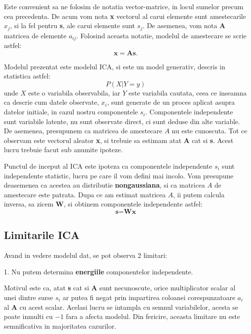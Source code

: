 \documentclass[12pt,oneside]{article}
\begin{document}
Este convenient sa ne folosim de notatia vector-matrice, in locul sumelor precum cea precedenta. De acum vom nota \textbf{x} vectorul al carui elemente sunt amestecarile $x_j$, si la fel pentru \textbf{s}, ale carui elemente sunt $s_j$. De asemenea, vom nota \textbf{A} matricea de elemente $a_{ij}$. Folosind aceasta notatie, modelul de amestecare se scrie astfel:
\begin{equation}
	\textbf{x}=\textbf{As}.
\end{equation}

Modelul prezentat este modelul ICA, si este un model generativ, descris in statistica astfel:
\begin{equation}
	P(X|Y=y) 
\end{equation}
unde $X$ este o variabila observabila, iar $Y$ este variabila cautata, ceea ce inseamna ca descrie cum datele observate, $x_i$, sunt generate de un proces aplicat asupra datelor initiale, in cazul nostru componentele $s_i$. Componentele independente sunt variabile latente, nu sunt observate direct, ci sunt deduse din alte variable. De asemenea, presupunem ca matricea de amestecare $A$ nu este cunoscuta. Tot ce observam este vectorul aleator \textbf{x}, si trebuie sa estimam atat \textbf{A} cat si \textbf{s}. Acest lucru trebuie facut sub anumite ipoteze.

Punctul de inceput al ICA este ipoteza ca componentele independente $s_i$ sunt independente statistic, lucru pe care il vom defini mai incolo. Vom presupune deasemenea ca acestea au distributie \textbf{nongaussiana}, si ca matricea $A$ de amestecare este patrata. Dupa ce am estimat matricea $A$, ii putem calcula inversa, sa zicem \textbf{W}, si obtinem componentele independente astfel:
\begin{equation}
\textbf{s}=\textbf{Wx}
\end{equation}

\subsection{Limitarile ICA}
Avand in vedere modelul dat, se pot observa 2 limitari:

1. Nu putem determina \textbf{energiile} componentelor independente.

Motivul este ca, atat \textbf{s} cat si \textbf{A} sunt necunoscute, orice multiplicator scalar al unei dintre surse $s_i$ ar putea fi negat prin impartirea coloanei corespunzatoare $a_i$ al \textbf{A} cu acest scalar. Acelasi lucru se intampla cu semnul variabilelor, acesta se poate inmulti cu $-1$ fara a afecta modelul. Din fericire, aceasta limitare nu este semnificativa in majoritatea cazurilor.
\end{document}
